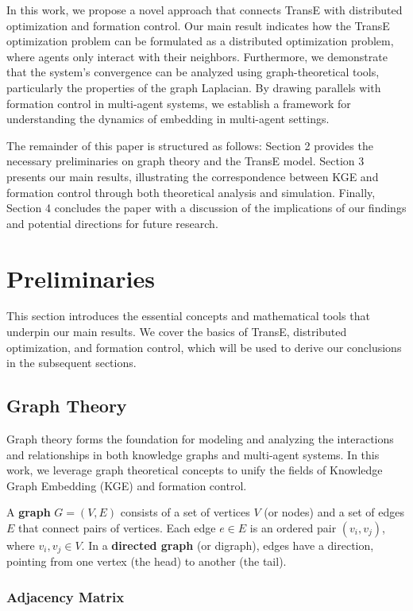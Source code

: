 \documentclass[letterpaper, 10 pt, conference]{ieeeconf}  %
\begin{document}
In this work, we propose a novel approach that connects TransE with distributed optimization and formation control. Our main result indicates how the TransE optimization problem can be formulated as a distributed optimization problem, where agents only interact with their neighbors. Furthermore, we demonstrate that the system's convergence can be analyzed using graph-theoretical tools, particularly the properties of the graph Laplacian. By drawing parallels with formation control in multi-agent systems, we establish a framework for understanding the dynamics of embedding in multi-agent settings.

The remainder of this paper is structured as follows: Section 2 provides the necessary preliminaries on graph theory and the TransE model. Section 3 presents our main results, illustrating the correspondence between KGE and formation control through both theoretical analysis and simulation. Finally, Section 4 concludes the paper with a discussion of the implications of our findings and potential directions for future research.

\section{Preliminaries}
This section introduces the essential concepts and mathematical tools that underpin our main results. We cover the basics of TransE, distributed optimization, and formation control, which will be used to derive our conclusions in the subsequent sections.

\subsection{Graph Theory}

Graph theory forms the foundation for modeling and analyzing the interactions and relationships in both knowledge graphs and multi-agent systems. In this work, we leverage graph theoretical concepts to unify the fields of Knowledge Graph Embedding (KGE) and formation control.

A \textbf{graph} \( G = (V, E) \) consists of a set of vertices \( V \) (or nodes) and a set of edges \( E \) that connect pairs of vertices. Each edge \( e \in E \) is an ordered pair \( (v_i, v_j) \), where \( v_i, v_j \in V \). In a \textbf{directed graph} (or digraph), edges have a direction, pointing from one vertex (the head) to another (the tail).

\subsubsection{Adjacency Matrix}
\end{document}
